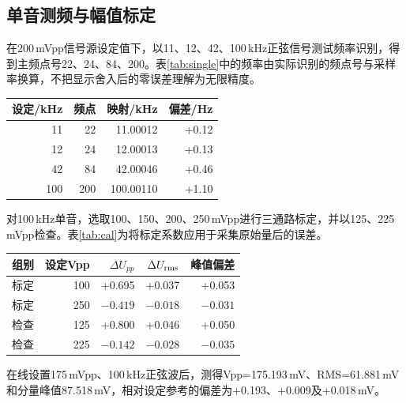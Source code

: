 \documentclass[UTF8,a4paper,12pt,oneside]{ctexart}
\newcommand{\TableStart}{\begingroup\fontsize{9.4pt}{12.8pt}\selectfont\renewcommand{\arraystretch}{1.07}\setlength{\tabcolsep}{4pt}}
\newcommand{\TableEnd}{\endgroup}
\begin{document}
\subsection{单音测频与幅值标定}
在200\,mVpp信号源设定值下，以11、12、42、100\,kHz正弦信号测试频率识别，得到主频点号22、24、84、200。表\ref{tab:single}中的频率由实际识别的频点号与采样率换算，不把显示舍入后的零误差理解为无限精度。
\par\noindent
\begin{minipage}[t]{0.57\linewidth}\vspace{0pt}\centering
{}\label{tab:single}
\TableStart\setlength{\tabcolsep}{3pt}\begin{tabular}{rrrr}
\toprule 设定/kHz & 频点 & 映射/kHz & 偏差/Hz\\\midrule
11 & 22 & 11.00012 & +0.12\\
12 & 24 & 12.00013 & +0.13\\
42 & 84 & 42.00046 & +0.46\\
100 & 200 & 100.00110 & +1.10\\\bottomrule
\end{tabular}\TableEnd\end{minipage}\hfill
\begin{minipage}[t]{0.4\linewidth}\vspace{0pt}对100\,kHz单音，选取100、150、200、250\,mVpp进行三通路标定，并以125、225\,mVpp检查。表\ref{tab:cal}为将标定系数应用于采集原始量后的误差。\end{minipage}\par\medskip
\par\noindent
\begin{minipage}[t]{0.54\linewidth}\vspace{0pt}\centering
{}\label{tab:cal}
\TableStart\setlength{\tabcolsep}{3pt}\begin{tabular}{lrrrr}
\toprule 组别 & 设定Vpp & $\Delta U_{pp}$ & $\Delta U_{\rm rms}$ & 峰值偏差\\\midrule
标定 & 100 & +0.695 & +0.037 & +0.053\\
标定 & 250 & $-0.419$ & $-0.018$ & $-0.031$\\
检查 & 125 & +0.800 & +0.046 & +0.050\\
检查 & 225 & $-0.142$ & $-0.028$ & $-0.035$\\\bottomrule
\end{tabular}\TableEnd\end{minipage}\hfill
\begin{minipage}[t]{0.43\linewidth}\vspace{0pt}在线设置175\,mVpp、100\,kHz正弦波后，测得Vpp=175.193\,mV、RMS=61.881\,mV和分量峰值87.518\,mV，相对设定参考的偏差为+0.193、+0.009及+0.018\,mV。\end{minipage}\par\medskip
\end{document}
